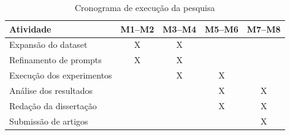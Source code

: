 \begin{table}[h]
\centering
\caption{Cronograma de execução da pesquisa}
\begin{tabular}{lcccc}
\hline
\textbf{Atividade} & \textbf{M1--M2} & \textbf{M3--M4} & \textbf{M5--M6} & \textbf{M7--M8} \\
\hline
Expansão do dataset & X & X &  &  \\
Refinamento de prompts & X & X &  &  \\
Execução dos experimentos &  & X & X &  \\
Análise dos resultados &  &  & X & X \\
Redação da dissertação &  &  & X & X \\
Submissão de artigos &  &  &  & X \\
\hline
\end{tabular}
\end{table}

